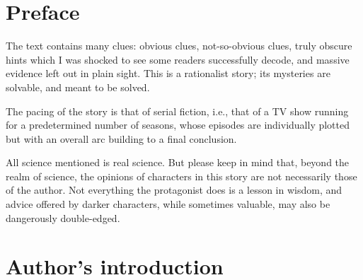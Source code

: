 \chapter*{Preface}

The text contains many clues: obvious clues, not-so-obvious clues, truly obscure hints which I was shocked to see some readers successfully decode, and massive evidence left out in plain sight. This is a rationalist story; its mysteries are solvable, and meant to be solved.

The pacing of the story is that of serial fiction, i.e., that of a TV show running for a predetermined number of seasons, whose episodes are individually plotted but with an overall arc building to a final conclusion.

All science mentioned is real science. But please keep in mind that, beyond the realm of science, the opinions of characters in this story are not necessarily those of the author. Not everything the protagonist does is a lesson in wisdom, and advice offered by darker characters, while sometimes valuable, may also be dangerously double-edged.

\chapter*{Author's introduction}


